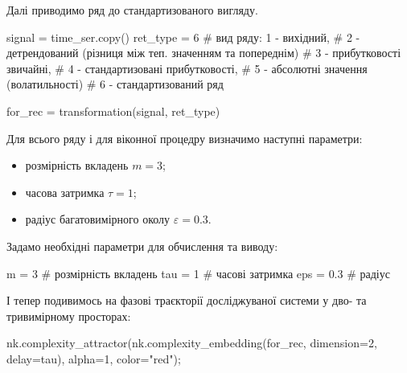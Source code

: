 \documentclass[
  letterpaper,
]{report}
\newenvironment{Shaded}{\begin{snugshade}}{\end{snugshade}}
\newcommand{\CommentTok}[1]{\textcolor[rgb]{0.37,0.37,0.37}{#1}}
\newcommand{\DecValTok}[1]{\textcolor[rgb]{0.68,0.00,0.00}{#1}}
\newcommand{\FloatTok}[1]{\textcolor[rgb]{0.68,0.00,0.00}{#1}}
\newcommand{\NormalTok}[1]{\textcolor[rgb]{0.00,0.23,0.31}{#1}}
\newcommand{\OperatorTok}[1]{\textcolor[rgb]{0.37,0.37,0.37}{#1}}
\newcommand{\StringTok}[1]{\textcolor[rgb]{0.13,0.47,0.30}{#1}}
\providecommand{\tightlist}{%
  \setlength{\itemsep}{0pt}\setlength{\parskip}{0pt}}\usepackage{longtable,booktabs,array}
\begin{document}
Далі приводимо ряд до стандартизованого вигляду.

\begin{Shaded}
\begin{Highlighting}[]
\NormalTok{signal }\OperatorTok{=}\NormalTok{ time\_ser.copy()}
\NormalTok{ret\_type }\OperatorTok{=} \DecValTok{6}    \CommentTok{\# вид ряду: 1 {-} вихідний, }
                \CommentTok{\# 2 {-} детрендований (різниця між теп. значенням та попереднім)}
                \CommentTok{\# 3 {-} прибутковості звичайні, }
                \CommentTok{\# 4 {-} стандартизовані прибутковості, }
                \CommentTok{\# 5 {-} абсолютні значення (волатильності)}
                \CommentTok{\# 6 {-} стандартизований ряд}

\NormalTok{for\_rec }\OperatorTok{=}\NormalTok{ transformation(signal, ret\_type) }
\end{Highlighting}
\end{Shaded}

Для всього ряду і для віконної процедру визначимо наступні параметри:

\begin{itemize}
\tightlist
\item
  розмірність вкладень \(m=3\);
\item
  часова затримка \(\tau=1\);
\item
  радіус багатовимірного околу \(\varepsilon = 0.3\).
\end{itemize}

Задамо необхідні параметри для обчислення та виводу:

\begin{Shaded}
\begin{Highlighting}[]
\NormalTok{m }\OperatorTok{=} \DecValTok{3}                         \CommentTok{\# розмірність вкладень}
\NormalTok{tau }\OperatorTok{=} \DecValTok{1}                       \CommentTok{\# часові затримка}
\NormalTok{eps }\OperatorTok{=} \FloatTok{0.3}                     \CommentTok{\# радіус}
\end{Highlighting}
\end{Shaded}

І тепер подивимось на фазові траєкторії досліджуваної системи у дво- та
тривимірному просторах:

\begin{Shaded}
\begin{Highlighting}[]
\NormalTok{nk.complexity\_attractor(nk.complexity\_embedding(for\_rec, dimension}\OperatorTok{=}\DecValTok{2}\NormalTok{, delay}\OperatorTok{=}\NormalTok{tau), }
\NormalTok{                        alpha}\OperatorTok{=}\DecValTok{1}\NormalTok{, }
\NormalTok{                        color}\OperatorTok{=}\StringTok{"red"}\NormalTok{)}\OperatorTok{;} 
\end{Highlighting}
\end{Shaded}
\end{document}
